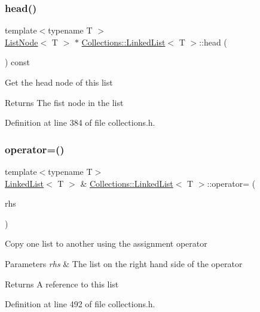 \subsubsection{\texorpdfstring{head()}{head()}}
{\footnotesize\ttfamily template$<$typename T $>$ \\
\hyperlink{class_collections_1_1_list_node}{List\+Node}$<$ T $>$ $\ast$ \hyperlink{class_collections_1_1_linked_list}{Collections\+::\+Linked\+List}$<$ T $>$\+::head (\begin{DoxyParamCaption}{ }\end{DoxyParamCaption}) const}

Get the head node of this list \begin{DoxyReturn}{Returns}
The fist node in the list 
\end{DoxyReturn}


Definition at line 384 of file collections.\+h.

\hypertarget{class_collections_1_1_linked_list_acefe88d73e0db57e3fb7a2529f650eef}{}\label{class_collections_1_1_linked_list_acefe88d73e0db57e3fb7a2529f650eef} 
\subsubsection{\texorpdfstring{operator=()}{operator=()}}
{\footnotesize\ttfamily template$<$typename T$>$ \\
\hyperlink{class_collections_1_1_linked_list}{Linked\+List}$<$ T $>$ \& \hyperlink{class_collections_1_1_linked_list}{Collections\+::\+Linked\+List}$<$ T $>$\+::operator= (\begin{DoxyParamCaption}\item[{const \hyperlink{class_collections_1_1_linked_list}{Linked\+List}$<$ T $>$ \&}]{rhs }\end{DoxyParamCaption})}

Copy one list to another using the assignment operator 
\begin{DoxyParams}{Parameters}
{\em rhs} & The list on the right hand side of the operator \\
\hline
\end{DoxyParams}
\begin{DoxyReturn}{Returns}
A reference to this list 
\end{DoxyReturn}


Definition at line 492 of file collections.\+h.

